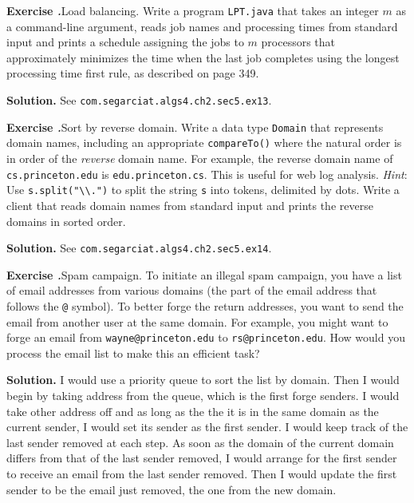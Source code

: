 \documentclass[12pt, a4paper]{article}
\newenvironment{ex}[2][Exercise]
{\par\medskip\noindent \textbf{#1 #2.}}
{\medskip}
\newenvironment{sol}[1][Solution]
{\par\medskip\noindent \textbf{#1.} }
{\medskip}
\begin{document}
	\begin{ex}{13}
		\emph{Load balancing}. Write a program \texttt{LPT.java} that takes an integer
		$m$ as a command-line argument, reads job names and processing times from standard
		input and prints a schedule assigning the jobs to $m$ processors that approximately
		minimizes the time when the last job completes using the longest processing time
		first rule, as described on page 349.
	\end{ex}
	\begin{sol}
		See \texttt{com.segarciat.algs4.ch2.sec5.ex13}.
	\end{sol}
	\begin{ex}{14}
		\emph{Sort by reverse domain}. Write a data type \texttt{Domain} that represents
		domain names, including an appropriate \texttt{compareTo()} where the natural order
		is in order of the \emph{reverse} domain name. For example, the reverse domain name
		of \texttt{cs.princeton.edu} is \texttt{edu.princeton.cs}. This is useful for web
		log analysis. \emph{Hint}: Use \texttt{s.split("\textbackslash\textbackslash.")}
		to split the string \texttt{s} into tokens, delimited by dots. Write a client that
		reads domain names from standard input and prints the reverse domains in sorted
		order.
	\end{ex}
	\begin{sol}
		See \texttt{com.segarciat.algs4.ch2.sec5.ex14}.
	\end{sol}
	\begin{ex}{15}
		\emph{Spam campaign}. To initiate an illegal spam campaign, you have a list of
		email addresses from various domains (the part of the email address that follows
		the \texttt{@} symbol). To better forge the return addresses, you want to send the
		email from another user at the same domain. For example, you might want to forge an
		email from \texttt{wayne@princeton.edu} to \texttt{rs@princeton.edu}. How would you
		process the email list to make this an efficient task?
	\end{ex}
	\begin{sol}
		I would use a priority queue to sort the list by domain. Then I would begin by
		taking address from the queue, which is the first forge senders. I would take
		other address off and as long as the the it is in the same domain as the current
		sender, I would set its sender as the first sender. I would keep track of the
		last sender removed at each step. As soon as the domain of the current domain
		differs from that of the last sender removed, I would arrange for the first
		sender to receive an email from the last sender removed. Then I would update
		the first sender to be the email just removed, the one from the new domain.
	\end{sol}
\end{document}
